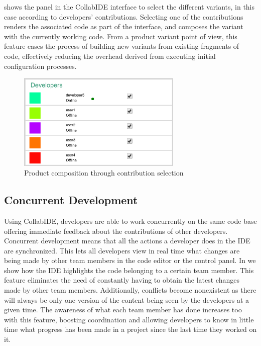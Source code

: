  shows the panel in the CollabIDE interface to select the different variants, in this 
case according to developers' contributions. Selecting one of the contributions renders the associated 
code as part of the interface, and composes the variant with the currently working code. From a 
product variant point of view, this feature eases the process of building new variants from existing 
fragments of code, effectively reducing the overhead derived from executing initial configuration 
processes.

\begin{figure}[htbp]
  \centering
  \includegraphics[width=0.7\textwidth]{img/fig3-collabIDEContributionManagement}
  \caption{Product composition through contribution selection}
  \label{fig:contribution}
\end{figure}


\subsection{Concurrent Development}
Using CollabIDE, developers are able to work concurrently on the same code base offering immediate feedback about the contributions of other developers.
Concurrent development means that all the actions a developer does in the IDE are synchronized. This lets all developers view in real time what changes are being made by other team members in the code editor or the control panel. In  we show how the IDE highlights the code belonging to a certain team member. This feature eliminates the need of constantly having to obtain the latest changes made by other team members. Additionally, conflicts become nonexistent as there will always be only one version of the content being seen by the developers at a given time. The awareness of what each team member has done increases too with this feature, boosting coordination and allowing developers to know in little time what progress has been made in a project since the last time they worked on it. 

